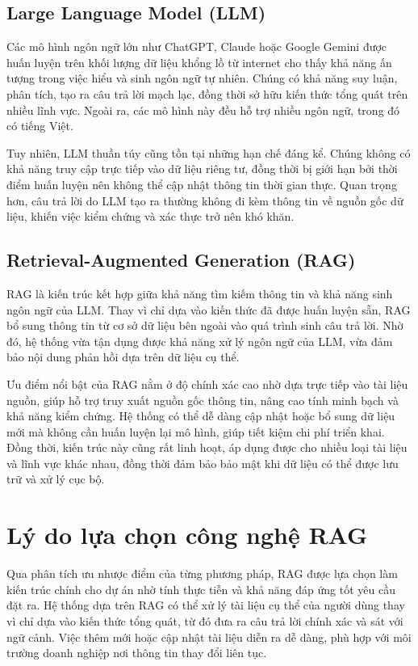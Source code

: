 \subsection{Large Language Model (LLM)}

Các mô hình ngôn ngữ lớn như ChatGPT, Claude hoặc Google Gemini được huấn luyện trên khối lượng dữ liệu khổng lồ từ internet cho thấy khả năng ấn tượng trong việc hiểu và sinh ngôn ngữ tự nhiên. Chúng có khả năng suy luận, phân tích, tạo ra câu trả lời mạch lạc, đồng thời sở hữu kiến thức tổng quát trên nhiều lĩnh vực. Ngoài ra, các mô hình này đều hỗ trợ nhiều ngôn ngữ, trong đó có tiếng Việt.

Tuy nhiên, LLM thuần túy cũng tồn tại những hạn chế đáng kể. Chúng không có khả năng truy cập trực tiếp vào dữ liệu riêng tư, đồng thời bị giới hạn bởi thời điểm huấn luyện nên không thể cập nhật thông tin thời gian thực. Quan trọng hơn, câu trả lời do LLM tạo ra thường không đi kèm thông tin về nguồn gốc dữ liệu, khiến việc kiểm chứng và xác thực trở nên khó khăn.

\subsection{Retrieval-Augmented Generation (RAG)}

RAG là kiến trúc kết hợp giữa khả năng tìm kiếm thông tin và khả năng sinh ngôn ngữ của LLM. Thay vì chỉ dựa vào kiến thức đã được huấn luyện sẵn, RAG bổ sung thông tin từ cơ sở dữ liệu bên ngoài vào quá trình sinh câu trả lời. Nhờ đó, hệ thống vừa tận dụng được khả năng xử lý ngôn ngữ của LLM, vừa đảm bảo nội dung phản hồi dựa trên dữ liệu cụ thể.

Ưu điểm nổi bật của RAG nằm ở độ chính xác cao nhờ dựa trực tiếp vào tài liệu nguồn, giúp hỗ trợ truy xuất nguồn gốc thông tin, nâng cao tính minh bạch và khả năng kiểm chứng. Hệ thống có thể dễ dàng cập nhật hoặc bổ sung dữ liệu mới mà không cần huấn luyện lại mô hình, giúp tiết kiệm chi phí triển khai. Đồng thời, kiến trúc này cũng rất linh hoạt, áp dụng được cho nhiều loại tài liệu và lĩnh vực khác nhau, đồng thời đảm bảo bảo mật khi dữ liệu có thể được lưu trữ và xử lý cục bộ.

\section{Lý do lựa chọn công nghệ RAG}

Qua phân tích ưu nhược điểm của từng phương pháp, RAG được lựa chọn làm kiến trúc chính cho dự án nhờ tính thực tiễn và khả năng đáp ứng tốt yêu cầu đặt ra. Hệ thống dựa trên RAG có thể xử lý tài liệu cụ thể của người dùng thay vì chỉ dựa vào kiến thức tổng quát, từ đó đưa ra câu trả lời chính xác và sát với ngữ cảnh. Việc thêm mới hoặc cập nhật tài liệu diễn ra dễ dàng, phù hợp với môi trường doanh nghiệp nơi thông tin thay đổi liên tục.


